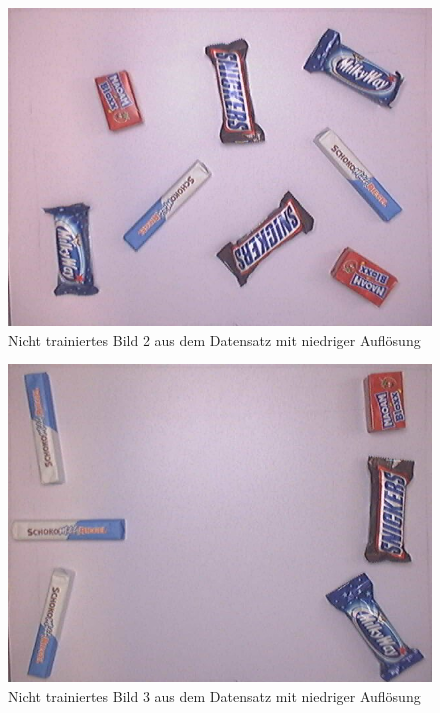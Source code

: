     \begin{figure}[H]
        \centering
        \includegraphics[angle = 90, width = \textwidth]{Bilder/models/model_comparison/images-to-detect/non_trained_2.jpg}
        \caption{Nicht trainiertes Bild 2 aus dem Datensatz mit niedriger Auflösung}
    \end{figure}
    
    \begin{figure}[H]
        \centering
        \includegraphics[angle = 90, width = \textwidth]{Bilder/models/model_comparison/images-to-detect/non_trained_3.jpg}
        \caption{Nicht trainiertes Bild 3 aus dem Datensatz mit niedriger Auflösung}
    \end{figure}
    
